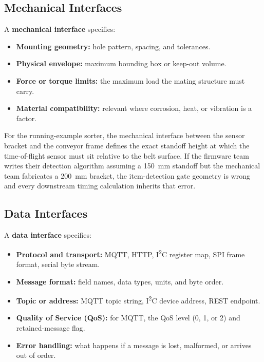 \subsection{Mechanical Interfaces}
\label{subsec:ch5-mech-interface}

A \textbf{mechanical interface} specifies:
\begin{itemize}
  \item \textbf{Mounting geometry:} hole pattern, spacing, and tolerances.
  \item \textbf{Physical envelope:} maximum bounding box or keep-out volume.
  \item \textbf{Force or torque limits:} the maximum load the mating structure must carry.
  \item \textbf{Material compatibility:} relevant where corrosion, heat, or vibration is a factor.
\end{itemize}

For the running-example sorter, the mechanical interface between the sensor bracket and the conveyor frame defines the exact standoff height at which the time-of-flight sensor must sit relative to the belt surface.
If the firmware team writes their detection algorithm assuming a 150~mm standoff but the mechanical team fabricates a 200~mm bracket, the item-detection gate geometry is wrong and every downstream timing calculation inherits that error.

\subsection{Data Interfaces}
\label{subsec:ch5-data-interface}

A \textbf{data interface} specifies:
\begin{itemize}
  \item \textbf{Protocol and transport:} MQTT, HTTP, I\textsuperscript{2}C register map, SPI frame format, serial byte stream.
  \item \textbf{Message format:} field names, data types, units, and byte order.
  \item \textbf{Topic or address:} MQTT topic string, I\textsuperscript{2}C device address, REST endpoint.
  \item \textbf{Quality of Service (QoS):} for MQTT, the QoS level (0, 1, or 2) and retained-message flag.
  \item \textbf{Error handling:} what happens if a message is lost, malformed, or arrives out of order.
\end{itemize}

